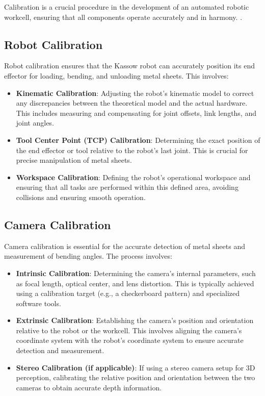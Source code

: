 Calibration is a crucial procedure in the development of 
an automated robotic workcell, ensuring that all components
operate accurately and in harmony.
.\subsection{Robot Calibration}
Robot calibration ensures that the Kassow robot can accurately position its end effector for loading, bending, and unloading metal sheets. This involves:

\begin{itemize}
    \item \textbf{Kinematic Calibration}: Adjusting the robot’s kinematic model to correct any discrepancies between the theoretical model and the actual hardware. This includes measuring and compensating for joint offsets, link lengths, and joint angles.
    \item \textbf{Tool Center Point (TCP) Calibration}: Determining the exact position of the end effector or tool relative to the robot’s last joint. This is crucial for precise manipulation of metal sheets.
    \item \textbf{Workspace Calibration}: Defining the robot’s operational workspace and ensuring that all tasks are performed within this defined area, avoiding collisions and ensuring smooth operation.
\end{itemize}

\subsection{Camera Calibration}
Camera calibration is essential for the accurate detection of metal sheets and measurement of bending angles. The process involves:

\begin{itemize}
    \item \textbf{Intrinsic Calibration}: Determining the camera's internal parameters, such as focal length, optical center, and lens distortion. This is typically achieved using a calibration target (e.g., a checkerboard pattern) and specialized software tools.
    \item \textbf{Extrinsic Calibration}: Establishing the camera’s position and orientation relative to the robot or the workcell. This involves aligning the camera’s coordinate system with the robot’s coordinate system to ensure accurate detection and measurement.
    \item \textbf{Stereo Calibration (if applicable)}: If using a stereo camera setup for 3D perception, calibrating the relative position and orientation between the two cameras to obtain accurate depth information.
\end{itemize}


